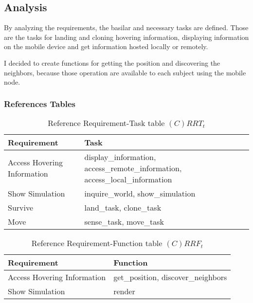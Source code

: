 \subsection{Analysis}

By analyzing the requirements, the basilar and necessary tasks are defined.
Those are the tasks for landing and cloning hovering information, displaying
information on the mobile device and get information hosted locally or
remotely.

I decided to create functions for getting the position and discovering the
neighbors, because those operation are available to each subject using the
mobile node.

\subsubsection{References Tables}

\begin{table}[H]
	\centering
	\begin{tabular}{|p{4cm}|p{8cm}|}
			\hline
			\textbf{Requirement} & \textbf{Task} \\
			\hline
      Access Hovering Information & display\_information,
                access\_remote\_information, access\_local\_information \\
			\hline
			Show Simulation & inquire\_world, show\_simulation \\
			\hline
			Survive & land\_task, clone\_task \\
			\hline
			Move & sense\_task, move\_task \\
			\hline
		\end{tabular}
	\caption{Reference Requirement-Task table $(C)RRT_t$}
	\label{tab:crrtt}
\end{table}

\begin{table}[H]
	\centering
	\begin{tabular}{|p{4cm}|p{8cm}|}
			\hline
			\textbf{Requirement} & \textbf{Function} \\
			\hline
			Access Hovering Information & get\_position, discover\_neighbors \\
			\hline
			Show Simulation & render \\
			\hline
		\end{tabular}
	\caption{Reference Requirement-Function table $(C)RRF_t$}
	\label{tab:crrft}
\end{table}

